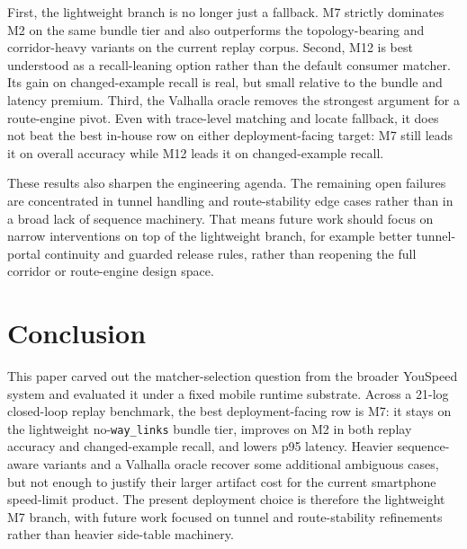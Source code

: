 \documentclass{IOS-Book-Article}
\begin{document}
First, the lightweight branch is no longer just a fallback. M7 strictly dominates M2 on the same bundle tier and also outperforms the topology-bearing and corridor-heavy variants on the current replay corpus. Second, M12 is best understood as a recall-leaning option rather than the default consumer matcher. Its gain on changed-example recall is real, but small relative to the bundle and latency premium. Third, the Valhalla oracle removes the strongest argument for a route-engine pivot. Even with trace-level matching and locate fallback, it does not beat the best in-house row on either deployment-facing target: M7 still leads it on overall accuracy while M12 leads it on changed-example recall.

These results also sharpen the engineering agenda. The remaining open failures are concentrated in tunnel handling and route-stability edge cases rather than in a broad lack of sequence machinery. That means future work should focus on narrow interventions on top of the lightweight branch, for example better tunnel-portal continuity and guarded release rules, rather than reopening the full corridor or route-engine design space.

\section{Conclusion}
This paper carved out the matcher-selection question from the broader YouSpeed system and evaluated it under a fixed mobile runtime substrate. Across a 21-log closed-loop replay benchmark, the best deployment-facing row is M7: it stays on the lightweight no-\texttt{way\_links} bundle tier, improves on M2 in both replay accuracy and changed-example recall, and lowers p95 latency. Heavier sequence-aware variants and a Valhalla oracle recover some additional ambiguous cases, but not enough to justify their larger artifact cost for the current smartphone speed-limit product. The present deployment choice is therefore the lightweight M7 branch, with future work focused on tunnel and route-stability refinements rather than heavier side-table machinery.



\end{document}
